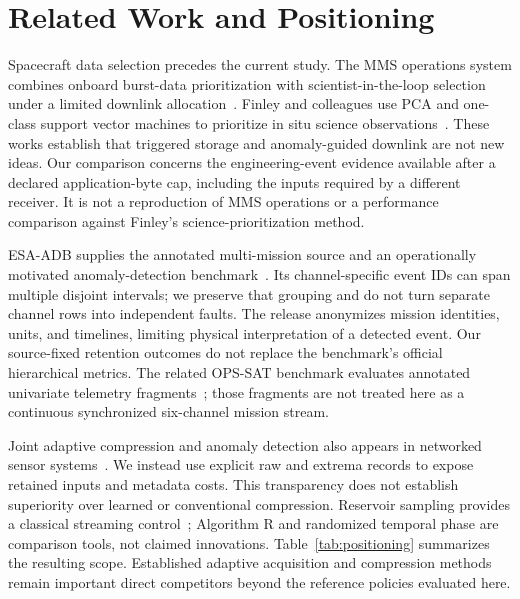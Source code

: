\section{Related Work and Positioning}
Spacecraft data selection precedes the current study. The MMS operations system
combines onboard burst-data prioritization with scientist-in-the-loop selection
under a limited downlink allocation~\citep{baker2016burst}. Finley and colleagues
use PCA and one-class support vector machines to prioritize in situ science
observations~\citep{finley2023prioritization,finley2024generalized}. These works
establish that triggered storage and anomaly-guided downlink are not new ideas.
Our comparison concerns the engineering-event evidence available after a declared
application-byte cap, including the inputs required by a different receiver.
It is not a reproduction of MMS operations or a performance comparison against
Finley's science-prioritization method.

ESA-ADB supplies the annotated multi-mission source and an operationally motivated
anomaly-detection benchmark~\citep{kotowski2026esa}. Its channel-specific event IDs
can span multiple disjoint intervals; we preserve that grouping and do not turn
separate channel rows into independent faults. The release anonymizes mission
identities, units, and timelines, limiting physical interpretation of a detected
event. Our source-fixed retention outcomes do not replace the benchmark's official
hierarchical metrics. The related OPS-SAT benchmark evaluates annotated univariate
telemetry fragments~\citep{ruszczak2025opssat}; those fragments are not treated here
as a continuous synchronized six-channel mission stream.

Joint adaptive compression and anomaly detection also appears in networked sensor
systems~\citep{elsayed2023compression}. We instead use explicit raw and extrema
records to expose retained inputs and metadata costs. This transparency does not
establish superiority over learned or conventional compression. Reservoir sampling
provides a classical streaming control~\citep{vitter1985reservoir}; Algorithm R
and randomized temporal phase are comparison tools, not claimed innovations.
Table~\ref{tab:positioning} summarizes the resulting scope. Established adaptive
acquisition and compression methods remain important direct competitors beyond
the reference policies evaluated here.

